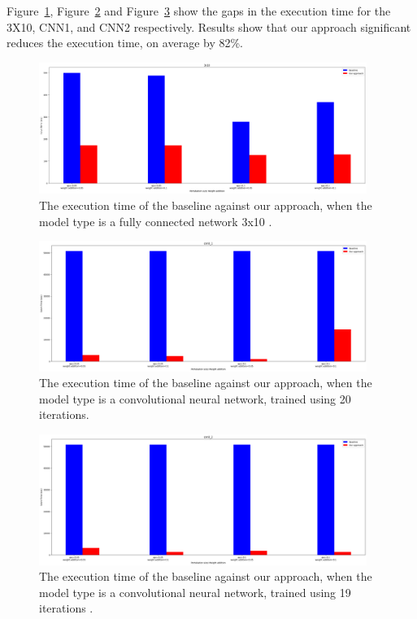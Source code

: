 Figure~\ref{fig:3_x_10}, Figure~\ref{fig:cnn0_1} and Figure~\ref{fig:cnn0_2} show the gaps in the execution time for the 3X10, CNN1, and CNN2 respectively.
Results show that our approach significant reduces the execution time, on average by 82\%. 
\begin{figure}[ht]
  \centering
  \includegraphics[width=0.95\textwidth]{3x10.png}
  \caption{The execution time of the baseline against our approach, when the model type is a fully connected network 3x10 .}
  \label{fig:3_x_10}
\end{figure}

\begin{figure}[ht]
  \centering
  \includegraphics[width=0.95\textwidth]{cnn0_1.png}
  \caption{The execution time of the baseline against our approach, when the model type is a convolutional neural network, trained using 20 iterations.}
  \label{fig:cnn0_1}
\end{figure}

\begin{figure}[ht]
  \centering
  \includegraphics[width=0.95\textwidth]{cnn0_2.png}
  \caption{The execution time of the baseline against our approach, when the model type is a convolutional neural network, trained using 19 iterations .}
  \label{fig:cnn0_2}
\end{figure}

